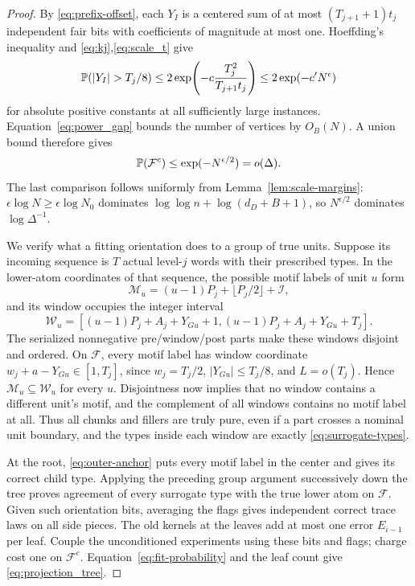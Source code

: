 \begin{proof}
By \eqref{eq:prefix-offset}, each $Y_I$ is a centered sum of at most $(T_{j+1}+1)t_j$ independent fair bits with coefficients of magnitude at most one.  Hoeffding's inequality \cite[Theorem~2]{Hoeffding1963} and \eqref{eq:kj},\eqref{eq:scale_t} give
\[
 \Prob(|Y_I|>T_j/8)
 \le 2\exp\!\left(-c\frac{T_j^2}{T_{j+1}t_j}\right)
 \le 2\exp(-c'N^\epsilon)
\]
for absolute positive constants at all sufficiently large instances.  Equation~\eqref{eq:power_gap} bounds the number of vertices by $O_B(N)$.  A union bound therefore gives
\begin{equation}\label{eq:fit-probability}
 \mathbb P(\mathcal F^c)\le\exp(-N^{\epsilon/2})=o(\Delta).
\end{equation}
The last comparison follows uniformly from Lemma~\ref{lem:scale-margins}: $\epsilon\log N\ge\epsilon\log N_0$ dominates $\log\log n+\log(d_D+B+1)$, so $N^{\epsilon/2}$ dominates $\log\Delta^{-1}$.

We verify what a fitting orientation does to a group of true units.  Suppose its incoming sequence is $T$ actual level-$j$ words with their prescribed types.  In the lower-atom coordinates of that sequence, the possible motif labels of unit $u$ form
\[
 \mathcal M_u=(u-1)P_j+\lfloor P_j/2\rfloor+\mathcal I,
\]
and its window occupies the integer interval
\[
 \mathcal W_u=[(u-1)P_j+A_j+Y_{Gu}+1,
                (u-1)P_j+A_j+Y_{Gu}+T_j].
\]
The serialized nonnegative pre/window/post parts make these windows disjoint and ordered.  On $\mathcal F$, every motif label has window coordinate $w_j+a-Y_{Gu}\in[1,T_j]$, since $w_j=T_j/2$, $|Y_{Gu}|\le T_j/8$, and $L=o(T_j)$.  Hence $\mathcal M_u\subseteq\mathcal W_u$ for every $u$.  Disjointness now implies that no window contains a different unit's motif, and the complement of all windows contains no motif label at all.  Thus all chunks and fillers are truly pure, even if a part crosses a nominal unit boundary, and the types inside each window are exactly \eqref{eq:surrogate-types}.

At the root, \eqref{eq:outer-anchor} puts every motif label in the center and gives its correct child type.  Applying the preceding group argument successively down the tree proves agreement of every surrogate type with the true lower atom on $\mathcal F$.  Given such orientation bits, averaging the flags gives independent correct trace laws on all side pieces.  The old kernels at the leaves add at most one error $E_{i-1}$ per leaf.  Couple the unconditioned experiments using these bits and flags; charge cost one on $\mathcal F^c$.  Equation~\eqref{eq:fit-probability} and the leaf count give \eqref{eq:projection_tree}.
\end{proof}

